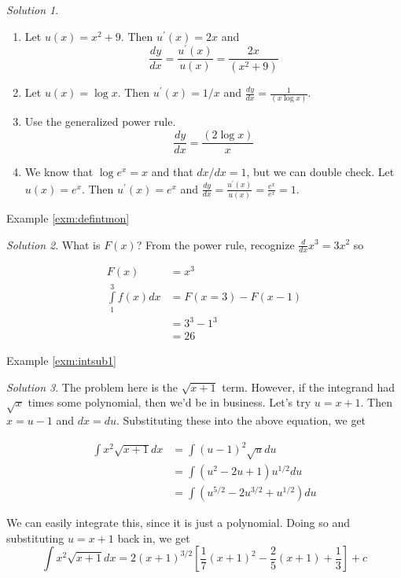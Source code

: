 \documentclass[
]{book}
\providecommand{\tightlist}{%
  \setlength{\itemsep}{0pt}\setlength{\parskip}{0pt}}
\theoremstyle{definition}
\theoremstyle{definition}
\theoremstyle{definition}
\theoremstyle{definition}
\theoremstyle{remark}
\newtheorem*{solution}{Solution}
\begin{document}
\begin{solution}
{}

\begin{enumerate}
\def\labelenumi{\arabic{enumi}.}
\tightlist
\item
  Let \(u(x)=x^2+9\). Then \(u^\prime(x)=2x\) and \[\frac{dy}{dx}= \frac{u^\prime(x)}{u(x)} = \frac{2x}{(x^2+9)}\]
\item
  Let \(u(x)=\log x\). Then \(u^\prime(x)=1/x\) and \(\frac{dy}{dx} = \frac{1}{(x\log x)}\).
\item
  Use the generalized power rule. \[\frac{dy}{dx} = \frac{(2 \log x)}{x}\]
\item
  We know that \(\log e^x=x\) and that \(dx/dx=1\), but we can double check. Let \(u(x)=e^x\). Then \(u^\prime(x)=e^x\) and \(\frac{dy}{dx} = \frac{u^\prime(x)}{u(x)} = \frac{e^x}{e^x} = 1.\)
\end{enumerate}
\end{solution}

Example \ref{exm:defintmon}

\begin{solution}
{}What is \(F(x)\)? From the power rule, recognize \(\frac{d}{dx}x^3 = 3x^2\) so

\begin{align*}
F(x) &= x^3\\
\int\limits_1^3 f(x) dx &= F(x = 3) - F(x  - 1)\\
&= 3^3 - 1^3\\
&=26
\end{align*}
\end{solution}

Example \ref{exm:intsub1}
\begin{solution}
{}The problem here is the \(\sqrt{x+1}\) term. However, if the integrand had \(\sqrt{x}\) times some polynomial, then we'd be in business. Let's try \(u=x+1\). Then \(x=u-1\) and \(dx=du\). Substituting these into the above equation, we get

\begin{align*}
            \int x^2\sqrt{x+1}dx&= \int (u-1)^2\sqrt{u}du\\
            &= \int (u^2-2u+1)u^{1/2}du\\
            &= \int (u^{5/2}-2u^{3/2}+u^{1/2})du
\end{align*}

We can easily integrate this, since it is just a polynomial. Doing so and substituting \(u=x+1\) back in, we get \[\int x^2\sqrt{x+1}dx=2(x+1)^{3/2}\left[\frac{1}{7}(x+1)^2 -
\frac{2}{5}(x+1)+\frac{1}{3}\right]+c\]
\end{solution}
\end{document}
